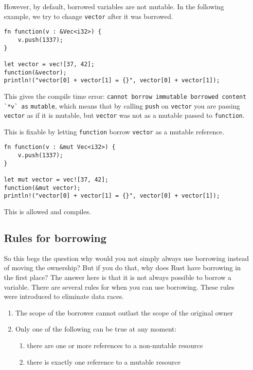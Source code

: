 However, by default, borrowed variables are not mutable. In the following example, we try to change \verb|vector| after it was borrowed. 

\begin{verbatim}
fn function(v : &Vec<i32>) {
    v.push(1337);
}

let vector = vec![37, 42];
function(&vector);
println!("vector[0] + vector[1] = {}", vector[0] + vector[1]);
\end{verbatim}

This gives the compile time error: \verb|cannot borrow immutable borrowed content `*v` as| \verb|mutable|, which means that by calling \verb|push| on \verb|vector| you are passing \verb|vector| as if it is mutable, but \verb|vector| was not as a mutable passed to \verb|function|. 

This is fixable by letting \verb|function| borrow \verb|vector| as a mutable reference. 

\begin{verbatim}
fn function(v : &mut Vec<i32>) {
    v.push(1337);
}

let mut vector = vec![37, 42];
function(&mut vector);
println!("vector[0] + vector[1] = {}", vector[0] + vector[1]);
\end{verbatim}

This is allowed and compiles. 

\subsection{Rules for borrowing}
So this begs the question why would you not simply always use borrowing instead of moving the ownership? But if you do that, why does Rust have borrowing in the first place? The answer here is that it is not always possible to borrow a variable. There are several rules for when you can use borrowing. These rules were introduced to eliminate data races. 
\begin{enumerate}[noitemsep]
    \item The scope of the borrower cannot outlast the scope of the original owner
\item Only one of the following can be true at any moment:
    \begin{enumerate}[noitemsep]
        \item there are one or more references to a non-mutable resource
        \item there is exactly one reference to a mutable resource
    \end{enumerate}
\end{enumerate}

